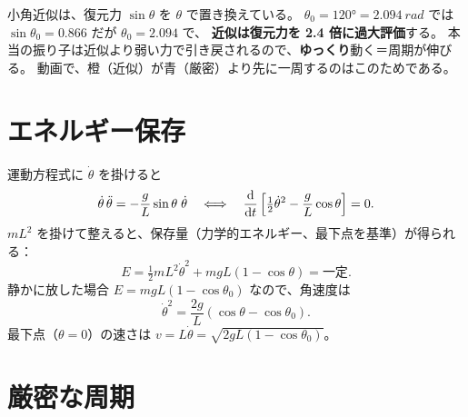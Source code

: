 小角近似は、復元力 $\sin\theta$ を $\theta$ で置き換えている。
$\theta_0=\ang{120}=\qty{2.094}{rad}$ では $\sin\theta_0=0.866$ だが $\theta_0=2.094$ で、
\textbf{近似は復元力を 2.4 倍に過大評価}する。
本当の振り子は近似より弱い力で引き戻されるので、\textbf{ゆっくり}動く＝周期が伸びる。
動画で、橙（近似）が青（厳密）より先に一周するのはこのためである。

\section{エネルギー保存}\label{sec:pend-energy}

運動方程式に $\dot\theta$ を掛けると
\begin{equation}
  \dot\theta\,\ddot\theta=-\frac gL\sin\theta\;\dot\theta
  \quad\Longleftrightarrow\quad
  \frac{\mathrm{d} }{\mathrm{d} t}\left[\tfrac12\dot\theta^2-\frac gL\cos\theta\right]=0.
\end{equation}
$mL^2$ を掛けて整えると、保存量（力学的エネルギー、最下点を基準）が得られる：
\begin{equation}
  E=\tfrac12mL^2\dot\theta^2+mgL(1-\cos\theta)=\text{一定}.
  \label{eq:pend-energy}
\end{equation}
静かに放した場合 $E=mgL(1-\cos\theta_0)$ なので、角速度は
\begin{equation}
  \dot\theta^2=\frac{2g}{L}\left(\cos\theta-\cos\theta_0\right).
  \label{eq:pend-omega}
\end{equation}
最下点（$\theta=0$）の速さは $v=L\dot\theta=\sqrt{2gL(1-\cos\theta_0)}$。

\section{厳密な周期}\label{sec:pend-period}

